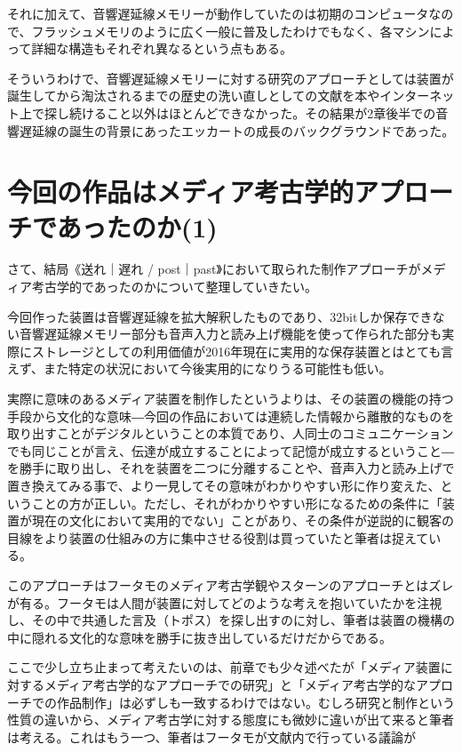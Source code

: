 \documentclass[a4paper,report]{jsbook}
\begin{document}
それに加えて、音響遅延線メモリーが動作していたのは初期のコンピュータなので、フラッシュメモリのように広く一般に普及したわけでもなく、各マシンによって詳細な構造もそれぞれ異なるという点もある。

そういうわけで、音響遅延線メモリーに対する研究のアプローチとしては装置が誕生してから淘汰されるまでの歴史の洗い直しとしての文献を本やインターネット上で探し続けること以外はほとんどできなかった。その結果が2章後半での音響遅延線の誕生の背景にあったエッカートの成長のバックグラウンドであった。

\section{今回の作品はメディア考古学的アプローチであったのか(1)}\label{ux4ecaux56deux306eux4f5cux54c1ux306fux30e1ux30c7ux30a3ux30a2ux8003ux53e4ux5b66ux7684ux30a2ux30d7ux30edux30fcux30c1ux3067ux3042ux3063ux305fux306eux304b1}

さて、結局《送れ｜遅れ /
post｜past》において取られた制作アプローチがメディア考古学的であったのかについて整理していきたい。

今回作った装置は音響遅延線を拡大解釈したものであり、32bitしか保存できない音響遅延線メモリー部分も音声入力と読み上げ機能を使って作られた部分も実際にストレージとしての利用価値が2016年現在に実用的な保存装置とはとても言えず、また特定の状況において今後実用的になりうる可能性も低い。

実際に意味のあるメディア装置を制作したというよりは、その装置の機能の持つ手段から文化的な意味―今回の作品においては連続した情報から離散的なものを取り出すことがデジタルということの本質であり、人同士のコミュニケーションでも同じことが言え、伝達が成立することによって記憶が成立するということ―を勝手に取り出し、それを装置を二つに分離することや、音声入力と読み上げで置き換えてみる事で、より一見してその意味がわかりやすい形に作り変えた、ということの方が正しい。ただし、それがわかりやすい形になるための条件に「装置が現在の文化において実用的でない」ことがあり、その条件が逆説的に観客の目線をより装置の仕組みの方に集中させる役割は買っていたと筆者は捉えている。

このアプローチはフータモのメディア考古学観やスターンのアプローチとはズレが有る。フータモは人間が装置に対してどのような考えを抱いていたかを注視し、その中で共通した言及（トポス）を探し出すのに対し、筆者は装置の機構の中に隠れる文化的な意味を勝手に抜き出しているだけだからである。

ここで少し立ち止まって考えたいのは、前章でも少々述べたが「メディア装置に対するメディア考古学的なアプローチでの研究」と「メディア考古学的なアプローチでの作品制作」は必ずしも一致するわけではない。むしろ研究と制作という性質の違いから、メディア考古学に対する態度にも微妙に違いが出て来ると筆者は考える。これはもう一つ、筆者はフータモが文献内で行っている議論が
\end{document}
